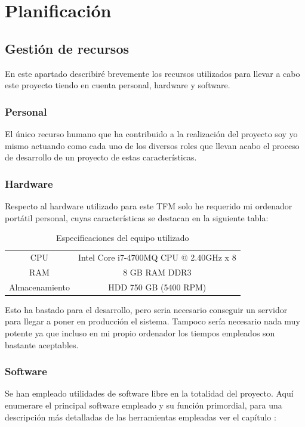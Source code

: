 \chapter{Planificación}

\section{Gestión de recursos}
En este apartado describiré brevemente los recursos utilizados para llevar a cabo este proyecto tiendo en cuenta personal, hardware y software.

\subsection{Personal}
El único recurso humano que ha contribuido a la realización del proyecto soy yo mismo actuando como cada uno de los diversos roles que llevan acabo el proceso de desarrollo de un proyecto de estas características.

\subsection{Hardware}
Respecto al hardware utilizado para este \acrshort{TFM} solo he requerido mi ordenador portátil personal, cuyas características se destacan en la siguiente tabla:

\begin{table} [h!]
\centering
\begin{tabular}{c c}
	\hline
	     CPU       & Intel \textregistered  Core \texttrademark  i7-4700MQ CPU @ 2.40GHz x 8 \\
	     RAM       & 8 GB RAM DDR3                                                           \\
	Almacenamiento & HDD 750 GB (5400 RPM)                                                   \\ \hline
\end{tabular}
	\caption{Especificaciones del equipo utilizado}
\end{table}

Esto ha bastado para el desarrollo, pero seria necesario conseguir un servidor para llegar a poner en producción el sistema. Tampoco sería necesario nada muy potente ya que incluso en mi propio ordenador los tiempos empleados son bastante aceptables.

\subsection{Software}
Se han empleado utilidades de software libre en la totalidad del proyecto. Aquí enumerare el principal software empleado y su función primordial, para una descripción más detalladas de las herramientas empleadas ver el capítulo :

